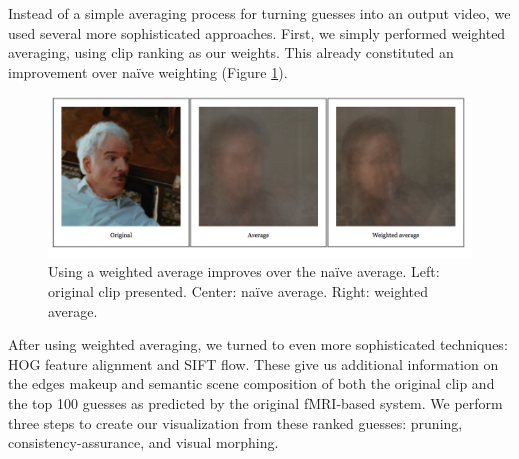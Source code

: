 Instead of a simple averaging process for turning guesses into an output video, we used several more sophisticated approaches.  First, we simply performed weighted averaging, using clip ranking as our weights.  This already constituted an improvement over na\"{i}ve weighting (Figure \ref{fig:weighted}).

\begin{figure}[t]
\centering
    \includegraphics[width=1.0\columnwidth]{figures/orig-avg-weighted.png}
\caption{Using a weighted average improves over the na\"{i}ve average.  Left: original clip presented.  Center: na\"{i}ve average.  Right: weighted average.}
\label{fig:weighted}
\end{figure}


After using weighted averaging, we turned to even more sophisticated techniques: HOG feature alignment and SIFT flow.  These give us additional information on the edges makeup and semantic scene composition of both the original clip and the top 100 guesses as predicted by the original fMRI-based system.  We perform three steps to create our visualization from these ranked guesses: pruning, consistency-assurance, and visual morphing.